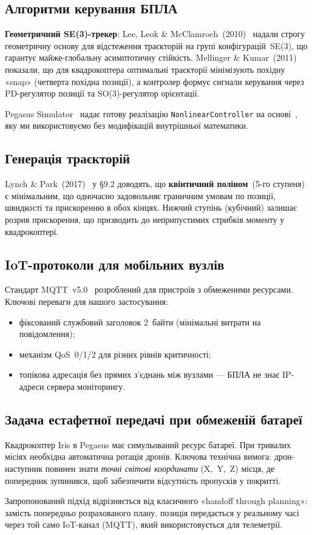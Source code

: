 \subsection{Алгоритми керування БПЛА}

\textbf{Геометричний SE(3)-трекер}: Lee, Leok \& McClamroch~(2010)~\cite{Lee2010} надали строгу геометричну основу для відстеження траєкторій на групі конфігурацій~SE(3), що гарантує майже-глобальну асимптотичну стійкість. Mellinger \& Kumar~(2011)~\cite{Mellinger2011} показали, що для квадрокоптера оптимальні траєкторії мінімізують похідну «snap» (четверта похідна позиції), а контролер формує сигнали керування через PD-регулятор позиції та SO(3)-регулятор орієнтації.

Pegasus Simulator~\cite{Pegasus2024} надає готову реалізацію \texttt{NonlinearController} на основі~\cite{Mellinger2011, Pinto2021}, яку ми використовуємо без модифікацій внутрішньої математики.

\subsection{Генерація траєкторій}

Lynch \& Park~(2017)~\cite{Lynch2017} у §9.2 доводять, що \textbf{квінтичний поліном}~(5-го ступеня) є мінімальним, що одночасно задовольняє граничним умовам по позиції, швидкості та прискоренню в обох кінцях. Нижчий ступінь (кубічний) залишає розрив прискорення, що призводить до неприпустимих стрибків моменту у квадрокоптері.

\subsection{IoT-протоколи для мобільних вузлів}

Стандарт MQTT~v5.0~\cite{MQTT5} розроблений для пристроїв з обмеженими ресурсами. Ключові переваги для нашого застосування:
\begin{itemize}
  \item фіксований службовий заголовок 2~байти (мінімальні витрати на повідомлення);
  \item механізм QoS~0/1/2 для різних рівнів критичності;
  \item топікова адресація без прямих з'єднань між вузлами — БПЛА не знає IP-адреси сервера моніторингу.
\end{itemize}

\subsection{Задача естафетної передачі при обмеженій батареї}

Квадрокоптер Iris в Pegasus має симульований ресурс батареї. При тривалих місіях необхідна автоматична ротація дронів. Ключова технічна вимога: дрон-наступник повинен знати \emph{точні світові координати} (X,~Y,~Z) місця, де попередник зупинився, щоб забезпечити відсутність пропусків у покритті.

Запропонований підхід відрізняється від класичного «handoff through planning»: замість попередньо розрахованого плану, позиція передається у реальному часі через той само IoT-канал (MQTT), який використовується для телеметрії.
